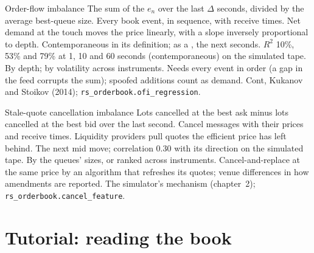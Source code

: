 \begin{predictorcard}{Order-flow imbalance}\label{pred:rs:order-book-features:ofi}
 The sum of the $e_n$ over the last $\Delta$ seconds, divided by the average best-queue size.
 Every book event, in sequence, with receive times.
 Net demand at the touch moves the price linearly, with a slope inversely proportional to depth.
 Contemporaneous in its definition; as a , the next seconds. $R^2$ 10\%, 53\% and 79\% at 1, 10 and 60
seconds (contemporaneous) on the simulated tape.
 By depth; by volatility across instruments.
 Needs every event in order (a gap in the feed corrupts the sum); spoofed additions count as demand.
 Cont, Kukanov and Stoikov (2014); \texttt{rs\_orderbook.ofi\_regression}.
\end{predictorcard}

\begin{predictorcard}{Stale-quote cancellation imbalance}\label{pred:rs:order-book-features:cancel}
 Lots cancelled at the best ask minus lots cancelled at the best bid over the last second.
 Cancel messages with their prices and receive times.
 Liquidity providers pull quotes the efficient price has left behind.
 The next mid move; correlation 0.30 with its direction on the simulated tape.
 By the queues' sizes, or ranked across instruments.
 Cancel-and-replace at the same price by an algorithm that refreshes its quotes; venue differences in how amendments
are reported.
 The simulator's mechanism (chapter~2); \texttt{rs\_orderbook.cancel\_feature}.
\end{predictorcard}

\section{Tutorial: reading the book}\label{tut:rs:order-book-features:read}

